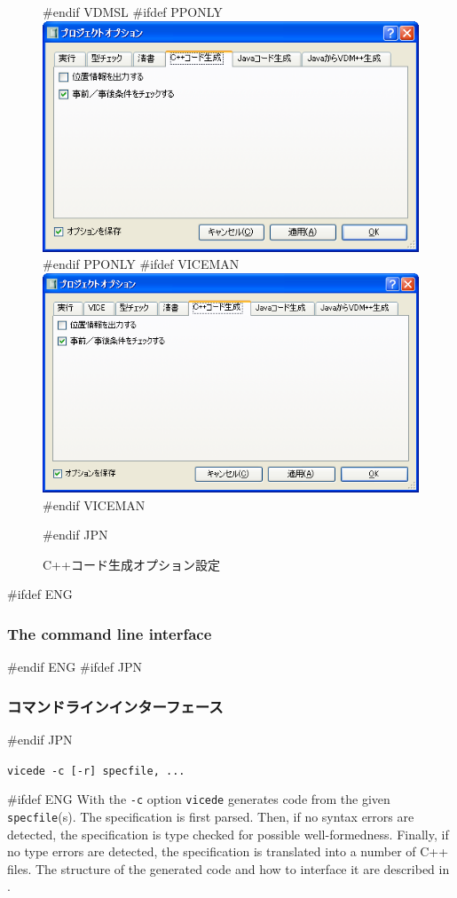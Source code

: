\documentclass[\pformat,12pt]{article}
\newcommand{\vdmde}{vdmde}
\newcommand{\vdmde}{vppde}
\renewcommand{\vdmde}{vicede}
\begin{document}
\begin{figure}[tbh]
\begin{center}
#endif VDMSL
#ifdef PPONLY
\includegraphics[width=12cm]{ccgOptions-pp.png}
#endif PPONLY
#ifdef VICEMAN
\includegraphics[width=12cm]{ccgOptions-vice.png}
#endif VICEMAN
\caption{C++コード生成オプション設定}
#endif JPN
\label{fig:optccg}
\end{center}
\end{figure}

#ifdef ENG
\subsubsection{The command line interface}
#endif ENG
#ifdef JPN
\subsubsection{コマンドラインインターフェース}
#endif JPN

{\tt \vdmde\ -c [-r] specfile, ...}

#ifdef ENG
With the {\tt -c} option {\tt \vdmde} generates code from the given
{\tt specfile}(s). The specification is first parsed. Then, if no syntax
errors are detected, the specification is type checked for possible
well-formedness. Finally, if no type
errors are detected, the specification is translated into a number of
C++ files. The structure of the generated code and
how to interface it are described in
.
\end{document}
